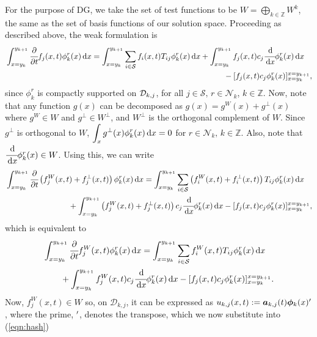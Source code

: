 For the purpose of DG, we take the set of test functions to be \(W = \bigoplus\limits_{k\in\mathbb Z} W^k\), the same as the set of basis functions of our solution space. Proceeding as described above, the weak formulation is 
\begin{align*}
	\begin{multlined}[t]\int_{x=y_k}^{y_{k+1}}\cfrac{\partial}{\partial t} f_j(x,t)\phi^r_k(x)\wrt x = \int_{x=y_k}^{y_{k+1}}\sum_{i\in\calS}  f_i(x,t)T_{ij}\phi^r_k(x)\wrt x  
	+  \int_{x=y_k}^{y_{k+1}} f_j(x,t)c_j\cfrac{\wrt}{\wrt x}\phi^r_k(x)\wrt x \\ {}- [f_j(x,t)c_j\phi^r_k(x)]_{x=y_k}^{x=y_{k+1}}, \end{multlined}
\end{align*}
since \(\phi^r_k\) is compactly supported on \(\mathcal{D}_{k,j}\), for all \(j\in\mathcal S,\,r\in\mathcal N_k\), \(k\in\mathbb Z.\) Now, note that any function \(g(x)\) can be decomposed as \(g(x) = g^{W}(x)+g^\perp(x)\) where \(g^{W}\in W\) and \(g^\perp \in W^\perp\), and \(W^\perp\) is the orthogonal complement of \(W\). Since \(g^\perp\) is orthogonal to \(W\), \(\displaystyle\int_{x}g^\perp(x)\phi^r_k(x)\, \mathrm{d} x=0\) for \(r\in\mathcal N_k,\,k\in\mathbb Z\). Also, note that \(\cfrac{\, \mathrm{d}}{\, \mathrm{d} x}\phi^r_k(x)\in W\). Using this, we can write 
\begin{align*}
	\begin{multlined}[t]\int_{x=y_{k}}^{y_{k+1}}\cfrac{\partial}{\partial t} \left(f_j^W(x,t)+f_j^\perp(x,t)\right)\phi^r_k(x)\wrt x 
	= \int_{x=y_k}^{y_{k+1}}\sum_{i\in\calS} \left(f_i^W(x,t)+f_i^\perp(x,t)\right)T_{ij}\phi^r_k(x)\wrt x  
	\\ {}
	+  \int_{x=y_k}^{y_{k+1}} \left(f_j^W(x,t)+f_j^\perp(x,t)\right)c_j\cfrac{\wrt}{\wrt x}\phi^r_k(x)\wrt x - [f_j(x,t)c_j\phi^r_k(x)]_{x=y_k}^{x=y_{k+1}}, \end{multlined}
\end{align*}
	which is equivalent to
\begin{align}
	\begin{multlined}[t]\int_{x=y_k}^{y_{k+1}}\cfrac{\partial}{\partial t} f_j^W(x,t)\phi^r_k(x)\wrt x = \int_{x=y_k}^{y_{k+1}}\sum_{i\in\calS} f_i^W(x,t)T_{ij}\phi^r_k(x)\wrt x  
	\\{} + \int_{x=y_k}^{y_{k+1}} f_j^W(x,t)c_j\cfrac{\wrt}{\wrt x}\phi^r_k(x)\wrt x - [f_j(x,t)c_j\phi^r_k(x)]_{x=y_k}^{x=y_{k+1}}. \end{multlined} \label{eqn:hash}
\end{align}
Now, \(f_j^W(x,t)\in W\) so, on \(\mathcal D_{k,j}\), it can be expressed as \(u_{k,j}(x,t):=\boldsymbol a_{k,j}(t) \boldsymbol \phi_k(x)'{}\), where the prime, \({}'{}\), denotes the transpose, which we now substitute into (\ref{eqn:hash})
